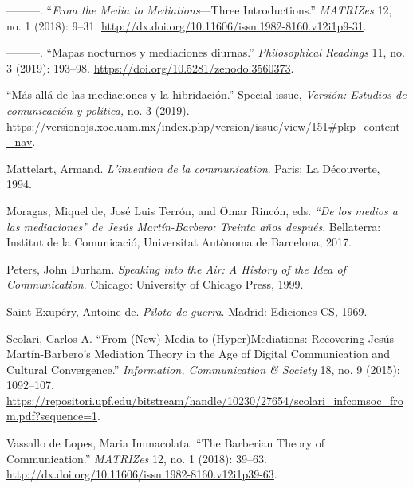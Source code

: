 \documentclass{tufte-handout}
\begin{document}
\begin{hangparas}{.25in}{1}
---------. ``\emph{From the Media to Mediations}---Three
Introductions.'' \emph{MATRIZes} 12, no. 1 (2018): 9--31.
\url{http://dx.doi.org/10.11606/issn.1982-8160.v12i1p9-31}.

---------. ``Mapas nocturnos y mediaciones diurnas.''
\emph{Philosophical Readings} 11, no. 3 (2019): 193--98.
\url{https://doi.org/10.5281/zenodo.3560373}.

``Más allá de las mediaciones y la hibridación.'' Special issue,
\emph{Versión: Estudios de comunicación y política,} no. 3 (2019).
\url{https://versionojs.xoc.uam.mx/index.php/version/issue/view/151\#pkp_content_nav}.

Mattelart, Armand. \emph{L'invention de la communication}. Paris: La
Découverte, 1994.

Moragas, Miquel de, José Luis Terrón, and Omar Rincón, eds. \emph{``De
los medios a las mediaciones'' de Jesús Martín-Barbero: Treinta años
después}. Bellaterra: Institut de la Comunicació, Universitat Autònoma
de Barcelona, 2017.

Peters, John Durham. \emph{Speaking into the Air: A History of the Idea
of Communication}. Chicago: University of Chicago Press, 1999.

Saint-Exupéry, Antoine de. \emph{Piloto de guerra}. Madrid: Ediciones
CS, 1969.

Scolari, Carlos A. ``From (New) Media to (Hyper)Mediations: Recovering
Jesús Martín-Barbero's Mediation Theory in the Age of Digital
Communication and Cultural Convergence.'' \emph{Information,
Communication \& Society} 18, no. 9 (2015): 1092--107.
\url{https://repositori.upf.edu/bitstream/handle/10230/27654/scolari_infcomsoc_from.pdf?sequence=1}.

Vassallo de Lopes, Maria Immacolata. ``The Barberian Theory of
Communication.'' \emph{MATRIZes} 12, no. 1 (2018): 39--63.
\url{http://dx.doi.org/10.11606/issn.1982-8160.v12i1p39-63}.



\end{hangparas}
\end{document}

